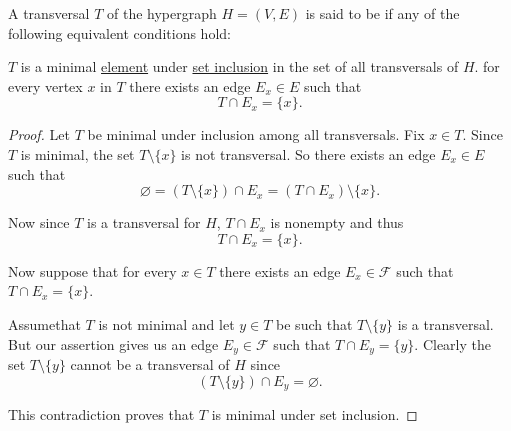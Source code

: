 \begin{definition}\label{def:minimal_hypergraph_transversal}
  A transversal \( T \) of the hypergraph \( H = (V, E) \) is said to be  if any of the following equivalent conditions hold:
  \begin{thmenum}
     \( T \) is a minimal \hyperref[def:preordered_set/maximal_minimal_element]{element} under \hyperref[rem:subset_and_membership_relations]{set inclusion} in the set of all transversals of \( H \).
     for every vertex \( x \) in \( T \) there exists an edge \( E_x \in E \) such that
    \begin{equation*}
      T \cap E_x = \{ x \}.
    \end{equation*}
  \end{thmenum}
\end{definition}
\begin{proof}
   Let \( T \) be minimal under inclusion among all transversals. Fix \( x \in T \). Since \( T \) is minimal, the set \( T \setminus \{ x \} \) is not transversal. So there exists an edge \( E_x \in E \) such that
  \begin{equation*}
    \varnothing = (T \setminus \{ x \}) \cap E_x = (T \cap E_x) \setminus \{ x \}.
  \end{equation*}

  Now since \( T \) is a transversal for \( H \), \( T \cap E_x \) is nonempty and thus
  \begin{equation*}
    T \cap E_x = \{ x \}.
  \end{equation*}

   Now suppose that for every \( x \in T \) there exists an edge \( E_x \in \mathcal{F} \) such that \( T \cap E_x = \{ x \} \).

  Assume\LEM that \( T \) is not minimal and let \( y \in T \) be such that \( T \setminus \{ y \} \) is a transversal. But our assertion gives us an edge \( E_y \in \mathcal{F} \) such that \( T \cap E_y = \{ y \} \). Clearly the set \( T \setminus \{ y \} \) cannot be a transversal of \( H \) since
  \begin{equation*}
    (T \setminus \{ y \}) \cap E_y = \varnothing.
  \end{equation*}

  This contradiction proves that \( T \) is minimal under set inclusion.
\end{proof}

